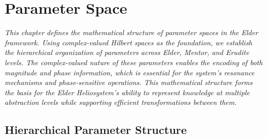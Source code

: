 \chapter{Parameter Space}

\textit{This chapter defines the mathematical structure of parameter spaces in the Elder framework. Using complex-valued Hilbert spaces as the foundation, we establish the hierarchical organization of parameters across Elder, Mentor, and Erudite levels. The complex-valued nature of these parameters enables the encoding of both magnitude and phase information, which is essential for the system's resonance mechanisms and phase-sensitive operations. This mathematical structure forms the basis for the Elder Heliosystem's ability to represent knowledge at multiple abstraction levels while supporting efficient transformations between them.}

\section{Hierarchical Parameter Structure}

